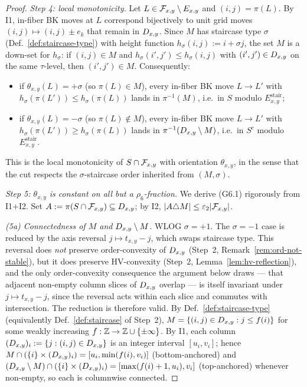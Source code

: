 \begin{proof}
\smallskip
\emph{Step 4: local monotonicity.}
Let $L\in\mathcal{F}_{x,y}\setminus E_{x,y}$ and $(i,j)=\pi(L)$. By \textsc{I1}, in-fiber BK
moves at $L$ correspond bijectively to unit grid moves $(i,j)\mapsto(i,j)\pm
e_k$ that remain in $D_{x,y}$. Since $M$ has staircase type $\sigma$
(Def.~\ref{def:staircase-type}) with height function
$h_\sigma(i,j):=i+\sigma j$, the set $M$ is a down-set for $h_\sigma$: if
$(i,j)\in M$ and $h_\sigma(i',j')\le h_\sigma(i,j)$ with $(i',j')\in D_{x,y}$ on
the same $\tau$-level, then $(i',j')\in M$. Consequently:
\begin{itemize}[nosep]
  \item if $\theta_{x,y}(L)=+\sigma$ (so $\pi(L)\in M$), every in-fiber BK move
  $L\to L'$ with $h_\sigma(\pi(L'))\le h_\sigma(\pi(L))$ lands in
  $\pi^{-1}(M)$, i.e.\ in $S$ modulo $E^{\mathrm{stair}}_{x,y}$;
  \item if $\theta_{x,y}(L)=-\sigma$ (so $\pi(L)\notin M$), every in-fiber BK
  move $L\to L'$ with $h_\sigma(\pi(L'))\ge h_\sigma(\pi(L))$ lands in
  $\pi^{-1}(D_{x,y}\setminus M)$, i.e.\ in $S^c$ modulo $E^{\mathrm{stair}}_{x,y}$.
\end{itemize}
This is the local monotonicity of $S\cap\mathcal{F}_{x,y}$ with orientation
$\theta_{x,y}$, in the sense that the cut respects the $\sigma$-staircase
order inherited from $(M,\sigma)$.

\smallskip
\emph{Step 5: $\theta_{x,y}$ is constant on all but a $\rho_6$-fraction.}
We derive (G6.1) rigorously from \textsc{I1}+\textsc{I2}. Set
$A:=\pi(S\cap\mathcal{F}_{x,y})\subseteq D_{x,y}$; by \textsc{I2},
$|A\triangle M|\le\varepsilon_2|\mathcal{F}_{x,y}|$.

\smallskip
\emph{(5a) Connectedness of $M$ and $D_{x,y}\setminus M$.}
WLOG $\sigma=+1$. The $\sigma=-1$ case is reduced by the axis reversal
$j\mapsto t_{x,y}-j$, which swaps staircase type. This reversal does
\emph{not} preserve order-convexity of $D_{x,y}$ (Step~2,
Remark~\ref{rem:ord-not-stable}), but it does preserve HV-convexity (Step~2,
Lemma~\ref{lem:hv-reflection}), and the only order-convexity consequence the
argument below draws --- that adjacent non-empty column slices of $D_{x,y}$
overlap --- is itself invariant under $j\mapsto t_{x,y}-j$, since the
reversal acts within each slice and commutes with intersection. The reduction
is therefore valid. By Def.~\ref{def:staircase-type}
(equivalently Def.~\ref{def:staircase} of Step~2),
$M=\{(i,j)\in D_{x,y}:j\le f(i)\}$ for some weakly increasing
$f:\mathbb{Z}\to\mathbb{Z}\cup\{\pm\infty\}$. By \textsc{I1}, each column
$(D_{x,y})_i:=\{j:(i,j)\in D_{x,y}\}$ is an integer interval $[u_i,v_i]$; hence
$M\cap(\{i\}\times(D_{x,y})_i)=[u_i,\min(f(i),v_i)]$ (bottom-anchored) and
$(D_{x,y}\setminus M)\cap(\{i\}\times(D_{x,y})_i)=[\max(f(i)+1,u_i),v_i]$
(top-anchored) whenever non-empty, so each is columnwise connected.


\end{proof}
